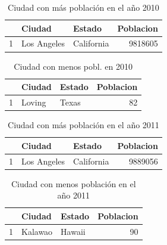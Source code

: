\documentclass[conference]{IEEEtran}\usepackage[]{graphicx}\usepackage[]{color}
\begin{document}
\begin{table}[ht]
\centering
\begin{tabular}{rllr}
  \hline
 & Ciudad & Estado & Poblacion \\ 
  \hline
1 & Los Angeles & California & 9818605 \\ 
   \hline
\end{tabular}
\caption{Ciudad con más población en el año 2010} 
\end{table}


\begin{table}[ht]
\centering
\begin{tabular}{rllr}
  \hline
 & Ciudad & Estado & Poblacion \\ 
  \hline
1 & Loving & Texas &  82 \\ 
   \hline
\end{tabular}
\caption{Ciudad con menos pobl. en 2010} 
\end{table}


\begin{table}[ht]
\centering
\begin{tabular}{rllr}
  \hline
 & Ciudad & Estado & Poblacion \\ 
  \hline
1 & Los Angeles & California & 9889056 \\ 
   \hline
\end{tabular}
\caption{Ciudad con más población en el año 2011} 
\end{table}


\begin{table}[ht]
\centering
\begin{tabular}{rllr}
  \hline
 & Ciudad & Estado & Poblacion \\ 
  \hline
1 & Kalawao & Hawaii &  90 \\ 
   \hline
\end{tabular}
\caption{Ciudad con menos población en el año 2011} 
\end{table}
\end{document}

